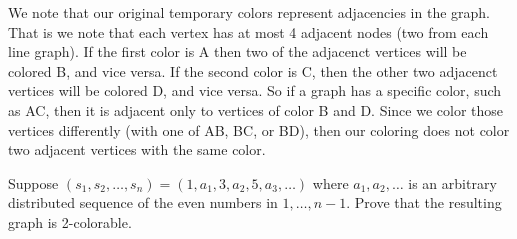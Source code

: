 \documentclass[12pt,twoside]{article}
\begin{document}
\begin{problem}{20}
{We note that our original temporary colors represent adjacencies in the graph. That is we note that each vertex has at most 4 adjacent nodes (two from each line graph). If the first color is A then two of the adjacenct vertices will be colored B, and vice versa. If the second color is C, then the other two adjacenct vertices will be colored D, and vice versa. So if a graph has a specific color, such as AC, then it is adjacent only to vertices of color B and D. Since we color those vertices differently (with one of AB, BC, or BD), then our coloring does not color two adjacent vertices with the same color.
}

Suppose $ (s_1,s_2, \ldots ,s_n)= (1,a_1,3,a_2,5,a_3, \ldots)$  where $a_1, a_2, \ldots$ is an arbitrary distributed sequence of the even numbers in ${1, \ldots, n-1}$. Prove that the resulting graph is 2-colorable.

\eparts
\end{problem}
\end{document}
